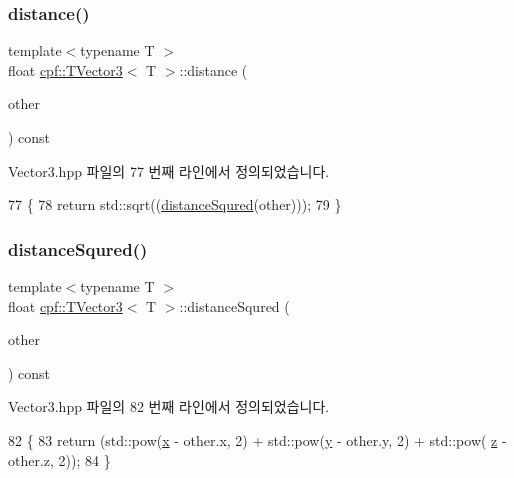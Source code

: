 \subsubsection{\texorpdfstring{distance()}{distance()}}
{\footnotesize\ttfamily template$<$typename T $>$ \\
float \hyperlink{classcpf_1_1_t_vector3}{cpf\+::\+T\+Vector3}$<$ T $>$\+::distance (\begin{DoxyParamCaption}\item[{const \hyperlink{classcpf_1_1_t_vector3}{T\+Vector3}$<$ T $>$ \&}]{other }\end{DoxyParamCaption}) const\hspace{0.3cm}{\ttfamily [inline]}}



Vector3.\+hpp 파일의 77 번째 라인에서 정의되었습니다.


\begin{DoxyCode}
77                                                     \{
78             \textcolor{keywordflow}{return} std::sqrt((\hyperlink{classcpf_1_1_t_vector3_a80b95c009f9a3910b6f379fc27d3afc4}{distanceSqured}(other)));
79         \}
\end{DoxyCode}
\mbox{\label{classcpf_1_1_t_vector3_a80b95c009f9a3910b6f379fc27d3afc4}} 
\subsubsection{\texorpdfstring{distance\+Squred()}{distanceSqured()}}
{\footnotesize\ttfamily template$<$typename T $>$ \\
float \hyperlink{classcpf_1_1_t_vector3}{cpf\+::\+T\+Vector3}$<$ T $>$\+::distance\+Squred (\begin{DoxyParamCaption}\item[{const \hyperlink{classcpf_1_1_t_vector3}{T\+Vector3}$<$ T $>$ \&}]{other }\end{DoxyParamCaption}) const\hspace{0.3cm}{\ttfamily [inline]}}



Vector3.\+hpp 파일의 82 번째 라인에서 정의되었습니다.


\begin{DoxyCode}
82                                                           \{
83             \textcolor{keywordflow}{return} (std::pow(\hyperlink{classcpf_1_1_t_vector3_ad3df42808358a64c518d6349ede446d8}{x} - other.x, 2) + std::pow(\hyperlink{classcpf_1_1_t_vector3_a2371a0583e76dcc80c6f10dd168cde1b}{y} - other.y, 2) + std::pow(
      \hyperlink{classcpf_1_1_t_vector3_ae7ea5f4b24c3438a44eb6b0fdfe02823}{z} - other.z, 2));
84         \}
\end{DoxyCode}
\mbox{\label{classcpf_1_1_t_vector3_af9fe0a68a8cb923f6a35c2a7efce5a20}} 
